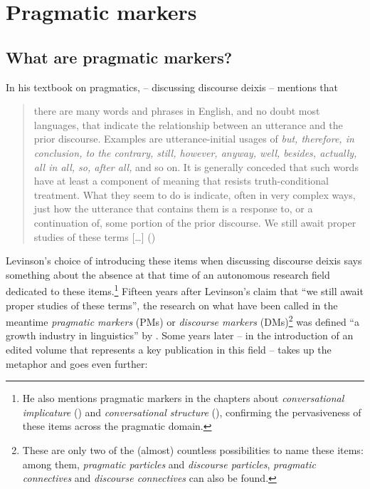 \chapter{Pragmatic markers}\label{sec:2}
\hypertarget{Toc124860610}{}\section{What are pragmatic markers?}
\hypertarget{Toc124860611}{}
In his textbook on pragmatics, \citet{Levinson1983} – discussing discourse deixis – mentions that

\begin{quote}
there are many words and phrases in English, and no doubt most languages, that indicate the relationship between an utterance and the prior discourse. Examples are utterance-initial usages of \textit{but, therefore, in} \textit{conclusion, to the contrary, still, however, anyway, well, besides, actually, all in all, so, after all,} and so on. It is generally conceded that such words have at least a component of meaning that resists truth-conditional treatment. What they seem to do is indicate, often in very complex ways, just how the utterance that contains them is a response to, or a continuation of, some portion of the prior discourse. We still await proper studies of these terms […] (\citealt[87--88]{Levinson1983})
\end{quote}

Levinson’s choice of introducing these items when discussing discourse deixis says something about the absence at that time of an autonomous research field dedicated to these items.\footnote{He also mentions pragmatic markers in the chapters about \textit{conversational implicature} (\citealt[162--163]{Levinson1983}) and \textit{conversational structure} (\citealt[365]{Levinson1983}), confirming the pervasiveness of these items across the pragmatic domain.} Fifteen years after Levinson’s claim that “we still await proper studies of these terms”, the research on what have been called in the meantime \textit{pragmatic markers} (PMs) or \textit{discourse markers} (DMs)\footnote{These are only two of the (almost) countless possibilities to name these items: among them, \textit{pragmatic particles} and \textit{discourse particles}, \textit{pragmatic connectives} and \textit{discourse connectives} can also be found.} was defined “a growth industry in linguistics” by \citet[932]{Fraser1999}. Some years later – in the introduction of an edited volume that represents a key publication in this field – \citet{Fischer2006} takes up the metaphor and goes even further:

